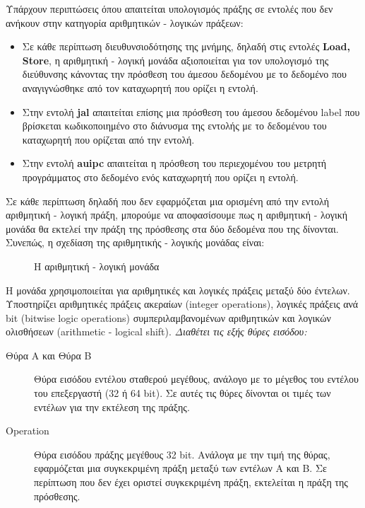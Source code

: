 \documentclass[11pt]{extarticle}
\begin{document}
Υπάρχουν περιπτώσεις όπου απαιτείται υπολογισμός πράξης σε εντολές που δεν ανήκουν στην κατηγορία αριθμητικών - λογικών πράξεων:
\begin{itemize}
    \item Σε κάθε περίπτωση διευθυνσιοδότησης της μνήμης, δηλαδή στις εντολές \textbf{Load, Store}, η αριθμητική - λογική μονάδα αξιοποιείται για τον υπολογισμό της διεύθυνσης κάνοντας την πρόσθεση του άμεσου δεδομένου με το δεδομένο που αναγιγνώσθηκε από τον καταχωρητή που ορίζει η εντολή.
    \item Στην εντολή \textbf{jal} απαιτείται επίσης μια πρόσθεση του άμεσου δεδομένου label που βρίσκεται κωδικοποιημένο στο διάνυσμα της εντολής με το δεδομένου του καταχωρητή που ορίζεται από την εντολή.
    \item Στην εντολή \textbf{auipc} απαιτείται η πρόσθεση του περιεχομένου του μετρητή προγράμματος στο δεδομένο ενός καταχωρητή που ορίζει η εντολή.
\end{itemize}
Σε κάθε περίπτωση δηλαδή που δεν εφαρμόζεται μια ορισμένη από την εντολή αριθμητική - λογική πράξη, μπορούμε να αποφασίσουμε πως η αριθμητική - λογική μονάδα θα εκτελεί την πράξη της πρόσθεσης στα δύο δεδομένα που της δίνονται. \newline
\newpage
Συνεπώς, η σχεδίαση της αριθμητικής - λογικής μονάδας είναι:
\begin{figure}[H]
    \centering
    \caption[Αριθμητική - Λογική Μονάδα]{Η αριθμητική - λογική μονάδα}
\end{figure}
Η μονάδα χρησιμοποιείται για αριθμητικές και λογικές πράξεις μεταξύ δύο έντελων. 
Υποστηρίζει αριθμητικές πράξεις ακεραίων (integer operations), λογικές πράξεις ανά bit (bitwise logic operations) συμπεριλαμβανομένων αριθμητικών και λογικών ολισθήσεων (arithmetic - logical shift).
\vspace{1em}
\newline
\textit{Διαθέτει τις εξής θύρες εισόδου:}
\begin{description}
 \item[Θύρα A και Θύρα B] Θύρα εισόδου εντέλου σταθερού μεγέθους, ανάλογο με το μέγεθος του εντέλου του επεξεργαστή (32 ή 64 bit). \newline
 Σε αυτές τις θύρες δίνονται οι τιμές των εντέλων για την εκτέλεση της πράξης.
 \item[Operation] Θύρα εισόδου πράξης μεγέθους 32 bit. \newline
 Ανάλογα με την τιμή της θύρας, εφαρμόζεται μια συγκεκριμένη πράξη μεταξύ των εντέλων Α και Β.
 Σε περίπτωση που δεν έχει οριστεί συγκεκριμένη πράξη, εκτελείται η πράξη της πρόσθεσης.
\end{description}
\end{document}

